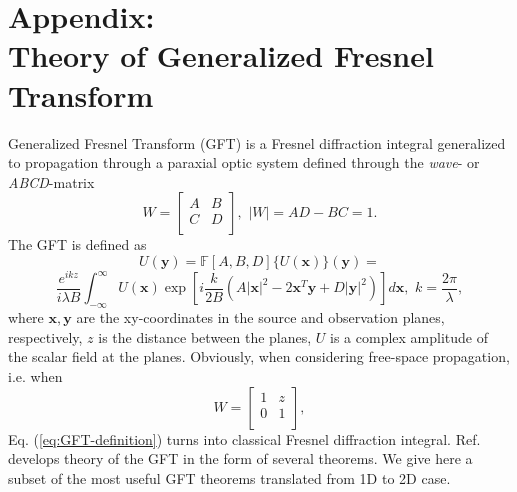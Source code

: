 
\newpage
\section{Appendix: \\ Theory of Generalized Fresnel Transform}
\label{app:Fresnel}

\mbox{}

Generalized Fresnel Transform (GFT) is a Fresnel diffraction integral
generalized to propagation through a paraxial optic system defined through
the \emph{wave}- or \emph{ABCD}-matrix  
\cite{SchmidtProp,PalmaBagini}
\begin{equation} \label{eq:ABCD-matrix}
  W =
  \left[
  \begin{array}{cc}
    A & B \\
    C & D \\
  \end{array}
  \right], \,\, |W| = AD-BC = 1.
\end{equation}
The GFT is defined as
\begin{equation} \label{eq:GFT-definition}
  U(\bm{y}) = \mathbb{F}[A,B,D] \{ U(\bm{x}) \} (\bm{y}) =
\end{equation}
$$
  \frac{e^{ikz}}{i \lambda B} \int_{-\infty}^{\infty} U(\bm{x})
  \exp \left[
  i \frac{k}{2B} (A|\bm{x}|^{2} - 2 \bm{x}^{T}\bm{y} + D |\bm{y}|^{2})
  \right] d\bm{x}, \,\, k = \frac{2 \pi}{\lambda},
$$
where $\bm{x,y}$ are the xy-coordinates in the source and observation planes,
respectively, $z$ is the distance between the planes, $U$ is a complex
amplitude of the scalar field at the planes. Obviously, when
considering free-space propagation, i.e. when
\begin{equation} \label{eq:free-space-ABCD}
  W =
  \left[
  \begin{array}{cc}
    1 & z \\
    0 & 1 \\
  \end{array}
  \right],
\end{equation}
Eq. (\ref{eq:GFT-definition}) turns into classical Fresnel diffraction
integral. Ref. \cite{PalmaBagini} develops theory of the GFT in the form of
several theorems. We give here a subset of the most useful GFT theorems
translated from 1D to 2D case.
\\ \\

